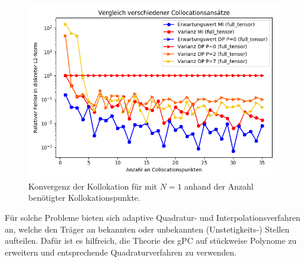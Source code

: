 \begin{figure}[!htb]
\includegraphics[width=\textwidth]{Figures/collocation_midp_trialdisconttriple.png}
\caption{Konvergenz der Kollokation für  mit $N=1$ anhand der Anzahl benötigter Kollokationspunkte.}
\label{fig:Kollokation_comparison_trialdisconttriple}
\end{figure}
Für solche Probleme bieten sich adaptive Quadratur- und Interpolationsverfahren an, welche den Träger an bekannten oder unbekannten (Unstetigkeits-) Stellen aufteilen. Dafür ist es hilfreich, die Theorie des gPC auf stückweise Polynome zu erweitern und entsprechende Quadraturverfahren zu verwenden.

